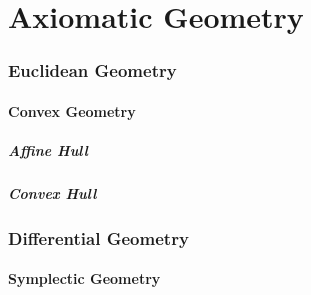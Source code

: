 \part{Axiomatic Geometry}\label{sec:axiomatic_geometry}

\section{Euclidean Geometry}\label{sec:euclidean_geometry}

\subsection{Convex Geometry}\label{sec:convex_geometry}

\subsubsection{Affine Hull}\label{sec:affine_hull}

\subsubsection{Convex Hull}\label{sec:convex_hull}



\section{Differential Geometry}\label{sec:differential_geometry}

\subsection{Symplectic Geometry}\label{sec:symplectic_geometry}
